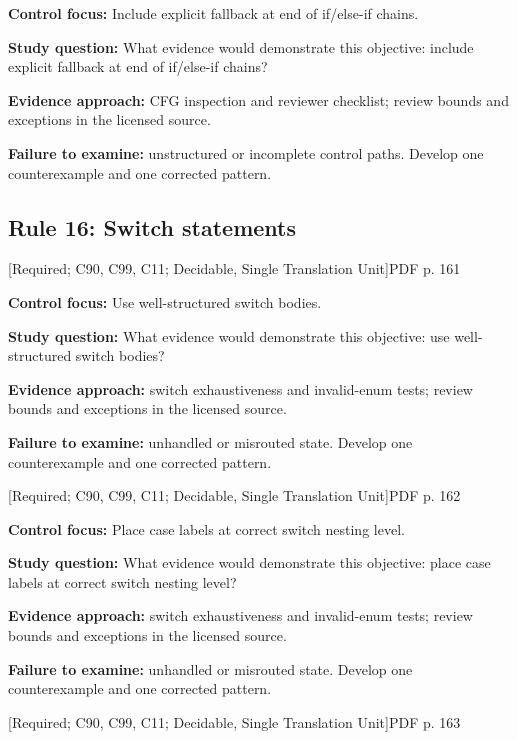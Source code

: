 \documentclass[10pt,letterpaper]{article}
\begin{document}
\textbf{Control focus:} Include explicit fallback at end of if/else-if chains.\par
\textbf{Study question:} What evidence would demonstrate this objective: include explicit fallback at end of if/else-if chains?\par
\textbf{Evidence approach:} CFG inspection and reviewer checklist; review bounds and exceptions in the licensed source.\par
\textbf{Failure to examine:} unstructured or incomplete control paths. Develop one counterexample and one corrected pattern.\par
\smallskip
\subsection{Rule 16: Switch statements}
 \textsf{\footnotesize [Required; C90, C99, C11; Decidable, Single Translation Unit]}\hfill{\footnotesize PDF p. 161}\par
\textbf{Control focus:} Use well-structured switch bodies.\par
\textbf{Study question:} What evidence would demonstrate this objective: use well-structured switch bodies?\par
\textbf{Evidence approach:} switch exhaustiveness and invalid-enum tests; review bounds and exceptions in the licensed source.\par
\textbf{Failure to examine:} unhandled or misrouted state. Develop one counterexample and one corrected pattern.\par
\smallskip
{}
 \textsf{\footnotesize [Required; C90, C99, C11; Decidable, Single Translation Unit]}\hfill{\footnotesize PDF p. 162}\par
\textbf{Control focus:} Place case labels at correct switch nesting level.\par
\textbf{Study question:} What evidence would demonstrate this objective: place case labels at correct switch nesting level?\par
\textbf{Evidence approach:} switch exhaustiveness and invalid-enum tests; review bounds and exceptions in the licensed source.\par
\textbf{Failure to examine:} unhandled or misrouted state. Develop one counterexample and one corrected pattern.\par
\smallskip
{}
 \textsf{\footnotesize [Required; C90, C99, C11; Decidable, Single Translation Unit]}\hfill{\footnotesize PDF p. 163}\par
\end{document}
